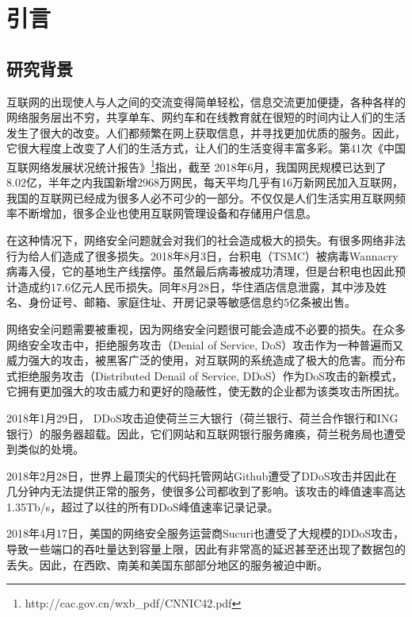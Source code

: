\chapter{引言}
\label{cha:intro}

\section{研究背景}
\label{sec:background}

互联网的出现使人与人之间的交流变得简单轻松，信息交流更加便捷，各种各样的网络服务层出不穷，共享单车、网约车和在线教育就在很短的时间内让人们的生活发生了很大的改变。人们都频繁在网上获取信息，并寻找更加优质的服务。因此，它很大程度上改变了人们的生活方式，让人们的生活变得丰富多彩。第41次《中国互联网络发展状况统计报告》\footnote{http://cac.gov.cn/wxb\_pdf/CNNIC42.pdf}指出，截至 2018年6月，我国网民规模已达到了8.02亿，半年之内我国新增2968万网民，每天平均几乎有16万新网民加入互联网，我国的互联网已经成为很多人必不可少的一部分。不仅仅是人们生活实用互联网频率不断增加，很多企业也使用互联网管理设备和存储用户信息。


在这种情况下，网络安全问题就会对我们的社会造成极大的损失。有很多网络非法行为给人们造成了很多损失。2018年8月3日，台积电（TSMC）被病毒Wannacry病毒入侵，它的基地生产线摆停。虽然最后病毒被成功清理，但是台积电也因此预计造成约17.6亿元人民币损失。同年8月28日，华住酒店信息泄露，其中涉及姓名、身份证号、邮箱、家庭住址、开房记录等敏感信息约5亿条被出售。

网络安全问题需要被重视，因为网络安全问题很可能会造成不必要的损失。在众多网络安全攻击中，拒绝服务攻击（Denial of Service, DoS）攻击作为一种普遍而又威力强大的攻击，被黑客广泛的使用，对互联网的系统造成了极大的危害。而分布式拒绝服务攻击（Distributed Denail of Service, DDoS）作为DoS攻击的新模式，它拥有更加强大的攻击威力和更好的隐蔽性，使无数的企业都为该类攻击所困扰。


2018年1月29日， DDoS攻击迫使荷兰三大银行（荷兰银行、荷兰合作银行和ING银行）的服务器超载。因此，它们网站和互联网银行服务瘫痪，荷兰税务局也遭受到类似的处境。

2018年2月28日，世界上最顶尖的代码托管网站Github遭受了DDoS攻击并因此在几分钟内无法提供正常的服务，使很多公司都收到了影响。该攻击的峰值速率高达1.35Tb/s，超过了以往的所有DDoS峰值速率记录记录。

2018年4月17日，美国的网络安全服务运营商Sucuri也遭受了大规模的DDoS攻击，导致一些端口的吞吐量达到容量上限，因此有非常高的延迟甚至还出现了数据包的丢失。因此，在西欧、南美和美国东部部分地区的服务被迫中断。

